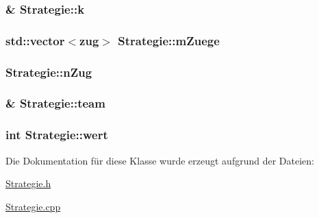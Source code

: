 \subsubsection[{k}]{ \& Strategie\+::k\hspace{0.3cm}{\ttfamily [protected]}}\label{class_strategie_abbf970c05c0033ae9f5df3766316846c}
\hypertarget{class_strategie_a99c5724d40dc860fc30c17a449815aa5}{}
\subsubsection[{m\+Zuege}]{\setlength{\rightskip}{0pt plus 5cm}std\+::vector$<${\bf zug}$>$ Strategie\+::m\+Zuege\hspace{0.3cm}{\ttfamily [protected]}}\label{class_strategie_a99c5724d40dc860fc30c17a449815aa5}
\hypertarget{class_strategie_a3f2847acbd3cd961853f0eadb6c05daf}{}
\subsubsection[{n\+Zug}]{ Strategie\+::n\+Zug\hspace{0.3cm}{\ttfamily [protected]}}\label{class_strategie_a3f2847acbd3cd961853f0eadb6c05daf}
\hypertarget{class_strategie_a4f55e74f189ec8c6df88a57119fb3def}{}
\subsubsection[{team}]{\& Strategie\+::team\hspace{0.3cm}{\ttfamily [protected]}}\label{class_strategie_a4f55e74f189ec8c6df88a57119fb3def}
\hypertarget{class_strategie_ad0b73259d206b7114d026f7c50074554}{}
\subsubsection[{wert}]{\setlength{\rightskip}{0pt plus 5cm}int Strategie\+::wert\hspace{0.3cm}{\ttfamily [protected]}}\label{class_strategie_ad0b73259d206b7114d026f7c50074554}


Die Dokumentation für diese Klasse wurde erzeugt aufgrund der Dateien\+:\begin{DoxyCompactItemize}
\item 
\hyperlink{_strategie_8h}{Strategie.\+h}\item 
\hyperlink{_strategie_8cpp}{Strategie.\+cpp}\end{DoxyCompactItemize}
